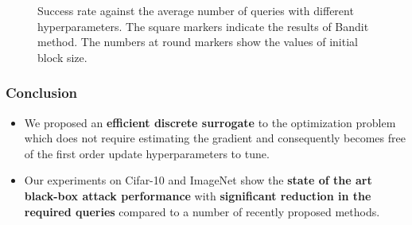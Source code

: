 \documentclass[10pt,mathserif]{beamer}
\begin{document}
\begin{frame}
\begin{figure}
    	\caption{Success rate against the average number of queries with different hyperparameters. The square markers indicate the results of Bandit method. The numbers at round markers show the values of initial block size.}
	\end{figure}
\end{frame}



\begin{frame}
    \frametitle{Conclusion}
    \begin{itemize}\itemsep=12pt
        \item We proposed an \textbf{efficient discrete surrogate} to the optimization problem which does not require estimating the gradient and consequently becomes free of the first order update hyperparameters to tune.\pause
        \item Our experiments on Cifar-10 and ImageNet show the \textbf{state of the art black-box attack performance} with \textbf{significant reduction in the required queries} compared to a number of recently proposed methods.
    \end{itemize}
\end{frame}
\end{document}
